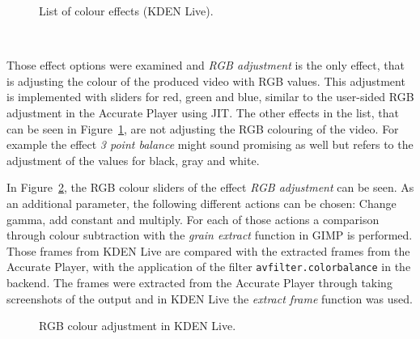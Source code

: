 \documentclass[../MasterThesis.tex]{subfiles}
\begin{document}
\begin{minipage}{0.48\textwidth}
	\vspace*{-0.3em}
	\begin{figure}[H]
	\begin{center}
		\caption[List of colour effects in KDEN Live.]{List of colour effects (KDEN Live).}
		\label{figure:kdenlive_effekte}
	\end{center}
	\end{figure}
	\vfill
	
	
\end{minipage}\begin{minipage}{0.04\textwidth}
	\ 
\end{minipage}\begin{minipage}{0.48\textwidth}
%
%
Those effect options were examined and \textit{RGB adjustment} is the only effect, that is adjusting the colour of the produced video with RGB values. This adjustment is implemented with sliders for red, green and blue, similar to the user-sided RGB adjustment in the Accurate Player using JIT. The other effects in the list, that can be seen in Figure~\ref{figure:kdenlive_effekte}, are not adjusting the RGB colouring of the video.
For example the effect \textit{3 point balance} might sound promising as well but refers to the adjustment of the values for black, gray and white.

\end{minipage}

\vspace*{0.6em}

In Figure~\ref{figure:kdenlive_rgb}, the RGB colour sliders of the effect \textit{RGB adjustment} can be seen. As an additional parameter, the following different actions can be chosen: Change gamma, add constant and multiply. For each of those actions a comparison through colour subtraction with the \textit{grain extract} function in GIMP is performed. Those frames from KDEN Live are compared with the extracted frames from the Accurate Player, with the application of the filter \texttt{avfilter.colorbalance} in the backend.
The frames were extracted from the Accurate Player through taking screenshots of the output and in KDEN Live the \textit{extract frame} function was used.


\begin{figure}[H]
	\begin{center}
		\caption[RGB colour adjustment in KDEN Live.]{RGB colour adjustment in KDEN Live.}
		\label{figure:kdenlive_rgb}
	\end{center}
\end{figure}
\end{document}
